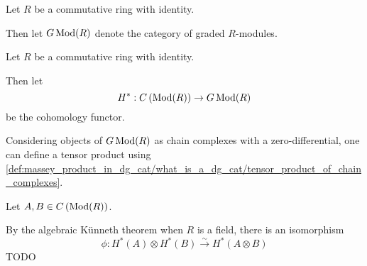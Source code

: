 \begin{notation}
    Let \( R \) be a commutative ring with identity.

    Then let \( G \operatorname{Mod}(R) \) denote the category of graded \( R \)-modules.
\end{notation}

\begin{notation}
    Let \( R \) be a commutative ring with identity.

    Then let
    \[
        H^*: C \left( \operatorname{Mod}(R) \right) \to G \operatorname{Mod}(R)
    \]
    be the cohomology functor.
\end{notation}

\begin{fact}
    \label{fact:massey_product_in_dg_cat/massey_product_definition/algebraic_kunneth_isomorphism}
    Considering objects of \( G \operatorname{Mod}(R) \) as chain complexes with a zero-differential, one can define a tensor product using \autoref{def:massey_product_in_dg_cat/what_is_a_dg_cat/tensor_product_of_chain_complexes}.

    Let \( A, B \in C \left( \operatorname{Mod}(R) \right) \).

    By the algebraic Künneth theorem when \( R \) is a field, there is an isomorphism
    \[
        \phi: H^*(A) \otimes H^*(B) \stackrel{\sim}{\to} H^*(A \otimes B)
    \]
    TODO
\end{fact}

